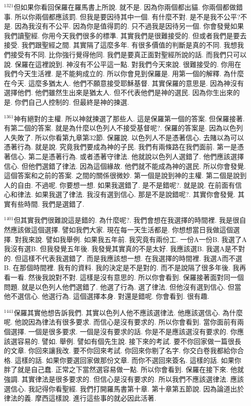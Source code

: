 \documentclass{book}
\begin{document}
$^{1321}$但如果你看回保羅在羅馬書上所說.
就不是.
因為你兩個都出貓.
你兩個都做錯事.
所以你兩個都應該罰.
但我是要因待其中一個.
有什麼不對.
是不是我不公平?不是.
因為我沒有不公平.
因為你是值得罰的.
只不過我是因待另一個.
你會發覺如果我們讀聖經.
你用今天我們很多的標準.
其實我們是很難接受的.
但或者我們是要去接受.
我們跟聖經之間.
其實隔了這麼多年.
有很多價值的判斷是真的不同.
我想我們接受有不同.
比你強行覺得他同.
我們是要真正面對聖經所說的話.
而我們只可以說.
保羅在這裡說到.
神沒有不公平這一點.
對我們今天來說.
很難接受的.
你用在我們今天生活裡.
是不能夠成立的.
所以你會見到保羅是.
用第一個的解釋.
為什麼在今天.
這麼多猶太人.
他們不願意接受耶穌基督.
其實保羅的意思是.
因為神沒有選擇他們.
他們雖然生出來是猶太人.
但不代表他們是神的選民.
因為你生出來的是.
你們自己人控制的.
但最終是神的揀選.

$^{1361}$神有絕對的主權.
所以神就揀選了那些人.
這是保羅第一個的答案.
但保羅接著.
有第二個的答案.
就是為什麼以色列人不接受基督呢?.
保羅的答案是.
因為以色列人失敗了.
所以你看第九章第32節.
保羅說.
以色列人不是憑著信心.
去賭以為可以憑著行為.
就是說.
究竟我們要成為神的子民.
我們有兩條路在我們面前.
第一是憑著信心.
第二是憑著行為.
或者憑著守律法.
他就說以色列人選錯了.
他們應該選擇信心.
但他們選錯了律法.
因為這個緣故.
他們就不能成為神的選民.
所以你會發覺.
這個答案和之前的答案.
之間的關係很微妙.
第一個是說到神的主權.
第二個是說到人的自由.
不過呢.
你要想一想.
如果我選錯了.
是不是錯呢?.
就是說.
在前面有信心和律法.
如果我選了律法.
我沒有選到信心.
那是不是說錯呢?.
其實你會發覺.
其實有些時間.
我們是選錯了.

$^{1401}$但其實我們很難說這是錯的.
為什麼呢?.
我們會想在我選擇的時間裡.
我是很自然應該做這個選擇.
譬如我們大家.
現在每一天生活都是.
你想想當日我做這個選擇.
對我來說.
譬如我舉例.
如果我五年前.
我究竟有兩份工.
一份A一份B.
我選了A我沒有選B.
但我發覺五年後.
我發覺其實真的不是太好.
我應該選B.
我選A是不對的.
但這樣不代表我選錯了.
而是我應該想一想.
在我選擇的時間裡.
我選A而不選B.
在那個時間裡.
我有的資料.
我的決定是不是對的.
而不是說隔了很多年後.
我再看一看.
然後我說對不對.
這樣是沒有意思的.
所以你會看到.
保羅接著面對同一個問題.
就是以色列人他們選錯了.
他選了行為.
選了律法.
但他沒有選到信心.
但當他不選信心.
他選行為.
這個選擇本身.
對還是錯呢.
你會看到.
很有趣.

$^{1441}$保羅其實他想告訴我們.
其實以色列人他不應該選律法.
他應該選信心.
為什麼呢.
他說因為律法有很多要求.
而信心是沒有要求的.
所以你會看到.
當你面前有兩個選擇.
一個是很多要求.
一個是沒有要求的話.
你是不是應該選沒有要求的.
你應該選容易的.
譬如.
舉例.
譬如有個先生說.
接下來的考試.
要不你回家做一篇很長的文章.
你回來讓我改.
要不你回來考試.
你回來你剔了名字.
你交白卷我都給你合格.
這樣的話.
如果你要選回家做那份文章.
而你不選回來簽名.
這樣的話.
如果你胖了就是自己蠢.
正常之下當然選容易做一點.
所以你會看到.
保羅在接下來.
他就強調.
其實律法是很多要求的.
但信心是沒有要求的.
所以我們不應該選律法.
應該選信心.
我記得你看聖經.
我們打開羅馬書第十章.
第十章第五節說.
因為論道出於律法的義.
摩西這樣說.
進行這些事的就必因此活著.
\end{document}

